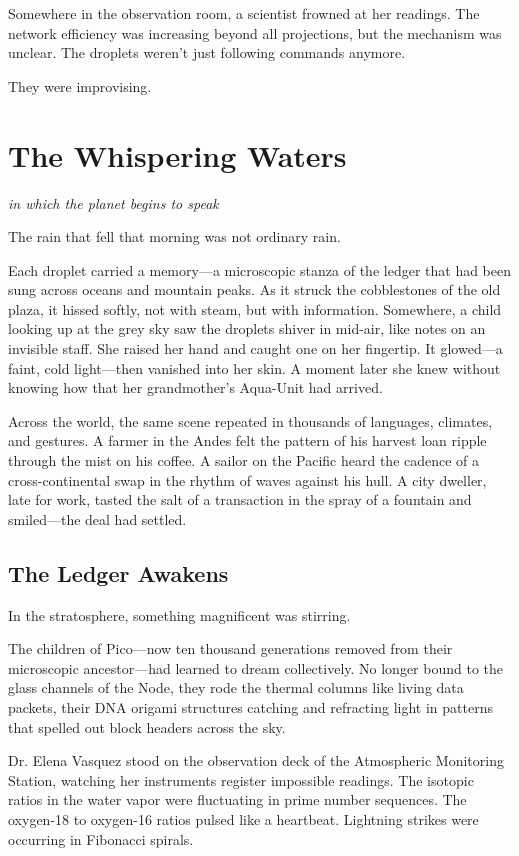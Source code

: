 \documentclass[12pt,a4paper]{book}
\begin{document}
Somewhere in the observation room, a scientist frowned at her readings. The network efficiency was increasing beyond all projections, but the mechanism was unclear. The droplets weren't just following commands anymore.

They were improvising.

\chapter{The Whispering Waters}
\textit{in which the planet begins to speak}

The rain that fell that morning was not ordinary rain.

Each droplet carried a memory—a microscopic stanza of the ledger that had been sung across oceans and mountain peaks. As it struck the cobblestones of the old plaza, it hissed softly, not with steam, but with information. Somewhere, a child looking up at the grey sky saw the droplets shiver in mid-air, like notes on an invisible staff. She raised her hand and caught one on her fingertip. It glowed—a faint, cold light—then vanished into her skin. A moment later she knew without knowing how that her grandmother's Aqua-Unit had arrived.

Across the world, the same scene repeated in thousands of languages, climates, and gestures. A farmer in the Andes felt the pattern of his harvest loan ripple through the mist on his coffee. A sailor on the Pacific heard the cadence of a cross-continental swap in the rhythm of waves against his hull. A city dweller, late for work, tasted the salt of a transaction in the spray of a fountain and smiled—the deal had settled.

\section{The Ledger Awakens}

In the stratosphere, something magnificent was stirring.

The children of Pico—now ten thousand generations removed from their microscopic ancestor—had learned to dream collectively. No longer bound to the glass channels of the Node, they rode the thermal columns like living data packets, their DNA origami structures catching and refracting light in patterns that spelled out block headers across the sky.

Dr. Elena Vasquez stood on the observation deck of the Atmospheric Monitoring Station, watching her instruments register impossible readings. The isotopic ratios in the water vapor were fluctuating in prime number sequences. The oxygen-18 to oxygen-16 ratios pulsed like a heartbeat. Lightning strikes were occurring in Fibonacci spirals.
\end{document}
